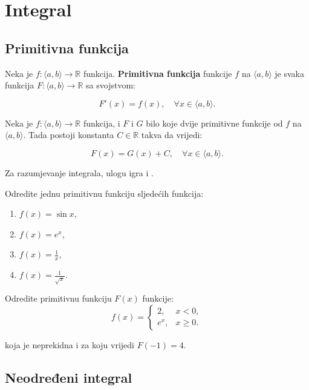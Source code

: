 \section{Integral}

\subsection{Primitivna funkcija}
Neka je $f: \langle a, b \rangle \to \mathbb{R}$ funkcija.
\textbf{Primitivna funkcija} funkcije $f$ na $\langle a, b \rangle$ je svaka
funkcija $F: \langle a, b \rangle \to \mathbb{R}$ sa svojstvom:

$$
F'(x) = f(x),\quad\forall x \in \langle a, b \rangle.
$$

\begin{theorem}
    Neka je $f: \langle a, b \rangle \to \mathbb{R}$ funkcija, i $F$ i $G$
    bilo koje dvije primitivne funkcije od $f$ na $\langle a, b \rangle$. Tada
    postoji konstanta $C\in\mathbb{R}$ takva da vrijedi:

    $$
    F(x) = G(x) + C,\quad\forall x \in \langle a, b \rangle.
    $$
\end{theorem}

Za razumjevanje integrala, ulogu igra i .

\begin{example}
    Odredite jednu primitivnu funkciju sljedećih funkcija:
    \begin{enumerate}
        \item $f(x) = \sin x$,
        \item $f(x) = e^x$,
        \item $f(x) = {\frac{1}{x}}$,
        \item $f(x) = {\frac{1}{\sqrt{x}}}$.
    \end{enumerate}
\end{example}

\begin{example}
    Odredite primitivnu funkciju $F(x)$ funkcije:
    $$
        f(x) = \begin{cases}
            2, & x < 0, \\
            e^x, & x \geq 0.
        \end{cases}
    $$

    koja je neprekidna i za koju vrijedi $F(-1) = 4$.
\end{example}

\subsection{Neodređeni integral}

